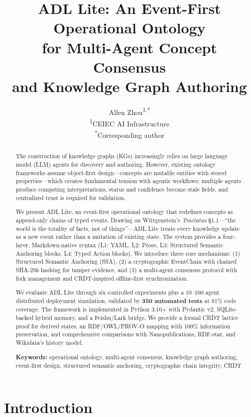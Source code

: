 \documentclass[11pt,a4paper]{article}
\title{\textbf{ADL Lite: An Event-First Operational Ontology\\for Multi-Agent Concept Consensus\\and Knowledge Graph Authoring}}
\author{Allen Zhou\textsuperscript{1,*}\\\small\textsuperscript{1}CEIEC AI Infrastructure\\\small\textsuperscript{*}Corresponding author}
\date{}
\theoremstyle{remark}
\begin{document}
\maketitle

\begin{abstract}
The construction of knowledge graphs (KGs) increasingly relies on large language model (LLM) agents for discovery and authoring. However, existing ontology frameworks assume object-first design---concepts are mutable entities with stored properties---which creates fundamental tension with agentic workflows: multiple agents produce competing interpretations, status and confidence become stale fields, and centralized trust is required for validation.

We present ADL Lite, an event-first operational ontology that redefines concepts as append-only chains of typed events. Drawing on Wittgenstein's \textit{Tractatus} \S1.1---``the world is the totality of facts, not of things''---ADL Lite treats every knowledge update as a new event rather than a mutation of existing state. The system provides a four-layer, Markdown-native syntax (L1: YAML, L2: Prose, L3: Structured Semantic Anchoring blocks, L4: Typed Action blocks). We introduce three core mechanisms: (1) Structured Semantic Anchoring (SSA), (2) a cryptographic EventChain with chained SHA-256 hashing for tamper evidence, and (3) a multi-agent consensus protocol with fork management and CRDT-inspired offline-first synchronization.

We evaluate ADL Lite through six controlled experiments plus a 10--100 agent distributed deployment simulation, validated by \textbf{350 automated tests} at 81\% code coverage. The framework is implemented in Python 3.10+ with Pydantic v2, SQLite-backed hybrid memory, and a Feishu/Lark bridge. We provide a formal CRDT lattice proof for derived states, an RDF/OWL/PROV-O mapping with 100\% information preservation, and comprehensive comparisons with Nanopublications, RDF-star, and Wikidata's history model.

\vspace{3mm}\noindent\textbf{Keywords:} operational ontology, multi-agent consensus, knowledge graph authoring, event-first design, structured semantic anchoring, cryptographic chain integrity, CRDT
\end{abstract}

\section{Introduction}
\label{sec:intro}
\end{document}
